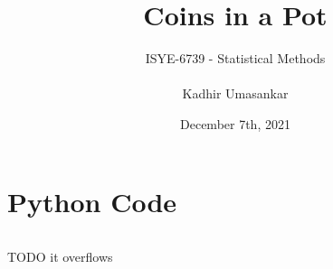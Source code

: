 \documentclass[12pt]{report}
\author{ISYE-6739 - Statistical Methods \\\\ Kadhir Umasankar}
\title{Coins in a Pot}
\date{December 7th, 2021}
\theoremstyle{definition}
\begin{document}
\maketitle







%





\appendix
\chapter{Python Code}
\inputminted{python}{../dice-game.py}
TODO it overflows
\end{document}
